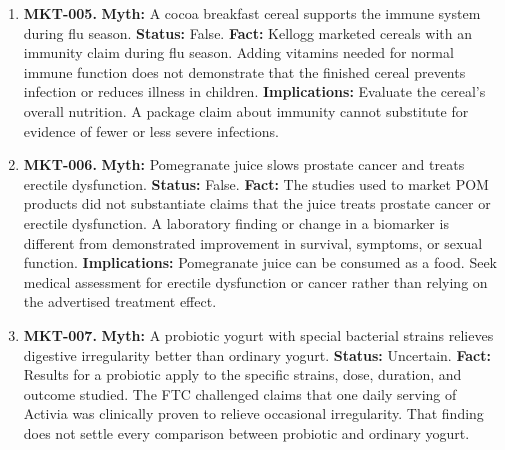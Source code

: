 \documentclass[11pt,oneside]{book}
\begin{document}
\begin{enumerate}[leftmargin=0pt,labelwidth=0pt,labelsep=0pt,itemindent=0pt]
\textbf{Status:} False.\newline
\textbf{Fact:} The Frosted Mini-Wheats advertisement emphasized a nearly 20 percent improvement. The study compared the cereal with no breakfast, and the average advantage in attentiveness was under 11 percent. It did not establish superiority over other breakfasts. \cite{ref87}\newline
\textbf{Implications:} When an advertisement reports a percentage, check what the comparison group ate and whether the figure describes the average child or a subgroup.
\item[] \textbf{MKT-005.} \textbf{Myth:} A cocoa breakfast cereal supports the immune system during flu season.\newline
\textbf{Status:} False.\newline
\textbf{Fact:} Kellogg marketed cereals with an immunity claim during flu season. Adding vitamins needed for normal immune function does not demonstrate that the finished cereal prevents infection or reduces illness in children. \cite{ref465}\newline
\textbf{Implications:} Evaluate the cereal's overall nutrition. A package claim about immunity cannot substitute for evidence of fewer or less severe infections.
\item[] \textbf{MKT-006.} \textbf{Myth:} Pomegranate juice slows prostate cancer and treats erectile dysfunction.\newline
\textbf{Status:} False.\newline
\textbf{Fact:} The studies used to market POM products did not substantiate claims that the juice treats prostate cancer or erectile dysfunction. A laboratory finding or change in a biomarker is different from demonstrated improvement in survival, symptoms, or sexual function. \cite{ref89}\newline
\textbf{Implications:} Pomegranate juice can be consumed as a food. Seek medical assessment for erectile dysfunction or cancer rather than relying on the advertised treatment effect.
\item[] \textbf{MKT-007.} \textbf{Myth:} A probiotic yogurt with special bacterial strains relieves digestive irregularity better than ordinary yogurt.\newline
\textbf{Status:} Uncertain.\newline
\textbf{Fact:} Results for a probiotic apply to the specific strains, dose, duration, and outcome studied. The FTC challenged claims that one daily serving of Activia was clinically proven to relieve occasional irregularity. That finding does not settle every comparison between probiotic and ordinary yogurt. \cite{ref466}\newline

\end{enumerate}
\end{document}
